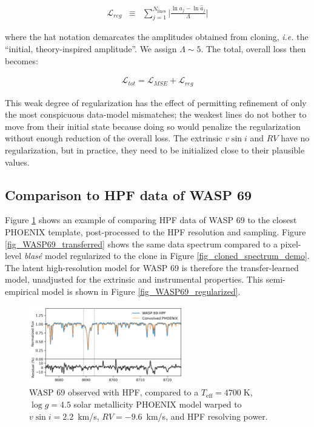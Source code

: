\documentclass[twocolumn]{aastex631}
\begin{document}
\begin{eqnarray}
    \mathcal{L}_{reg} &\equiv& \sum_{j=1}^{N_\mathrm{lines}} \Big|\frac{\ln{a_j} - \ln{\hat{a}_j}}{\Lambda}\Big|
\end{eqnarray}

where the hat notation demarcates the amplitudes obtained from cloning, \emph{i.e.} the ``initial, theory-inspired amplitude''.  We assign $\Lambda\sim5$.  The total, overall loss then becomes:

\begin{eqnarray}
    \mathcal{L}_{tot} = \mathcal{L}_{MSE} + \mathcal{L}_{reg}
\end{eqnarray}

This weak degree of regularization has the effect of permitting refinement of only the most conspicuous data-model mismatches; the weakest lines do not bother to move from their initial state because doing so would penalize the regularization without enough reduction of the overall loss.  The extrinsic $v\sin{i}$ and $RV$ have no regularization, but in practice, they need to be initialized close to their plausible values.

\subsection{Comparison to HPF data of WASP 69}

Figure \ref{fig_WASP69_demo} shows an example of comparing HPF data of WASP 69 to the closest PHOENIX template, post-processed to the HPF resolution and sampling.  Figure \ref{fig_WASP69_transferred} shows the same data spectrum compared to a pixel-level \emph{blas\'e} model regularized to the clone in Figure \ref{fig_cloned_spectrum_demo}.  The latent high-resolution model for WASP 69 is therefore the transfer-learned model, unadjusted for the extrinsic and instrumental properties.  This semi-empirical model is shown in Figure \ref{fig_WASP69_regularized}.


\begin{figure}[hbt!]
    \centering
    \includegraphics[width=0.6\textwidth]{figures/blase_WASP69_demo.png}
    \caption{WASP 69 observed with HPF, compared to a $T_{\mathrm{eff}}=4700\;$K,  $\log{g}=4.5$ solar metallicity PHOENIX model warped to $v\sin{i}=2.2$~km/s, $RV=-9.6$~km/s, and HPF resolving power.}
    \label{fig_WASP69_demo}
\end{figure}
\end{document}

